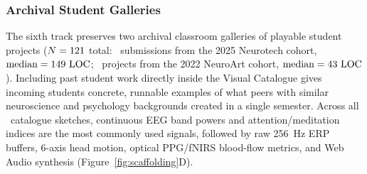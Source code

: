 \documentclass[11pt]{article}
\begin{document}
\subsubsection{Archival Student Galleries}
The sixth track preserves two archival classroom galleries of playable student projects ($N = 121$ total: \NNeurotechCatalogue\ submissions from the 2025 Neurotech cohort, $\text{median} = 149\text{ LOC}$; \NNeuroArtGallery\ projects from the 2022 NeuroArt cohort, $\text{median} = 43\text{ LOC}$). Including past student work directly inside the Visual Catalogue gives incoming students concrete, runnable examples of what peers with similar neuroscience and psychology backgrounds created in a single semester. Across all \NCatalogueSketches\ catalogue sketches, continuous EEG band powers and attention/meditation indices are the most commonly used signals, followed by raw 256~Hz ERP buffers, 6-axis head motion, optical PPG/fNIRS blood-flow metrics, and Web Audio synthesis (Figure~\ref{fig:scaffolding}D).
\end{document}
